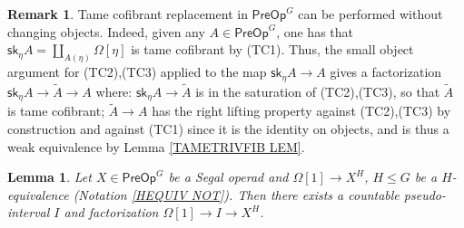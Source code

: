 \documentclass[a4paper,10pt
,draft
]{article}%
\numberwithin{equation}{section}
\numberwithin{figure}{section}
\newtheorem{lemma}[equation]{Lemma}%
\theoremstyle{definition} %
\newtheorem{remark}[equation]{Remark}%
\newcommand{\1}{\ensuremath{\mathbbm 1}}%
\begin{document}
\begin{remark}\label{TC2TC3REP REM}
	Tame cofibrant replacement in $\mathsf{PreOp}^G$
	can be performed without changing objects.
	Indeed, given any 
	$A \in \mathsf{PreOp}^G$,
	one has that
	$\mathsf{sk}_{\eta} A = 
	\coprod_{A(\eta)} \Omega[\eta]$
	is tame cofibrant by (TC1).
	Thus, the small object argument for (TC2),(TC3) 
	applied to the map 
	$\mathsf{sk}_{\eta} A \to A$
	gives a factorization
	$\mathsf{sk}_{\eta} A \to \widetilde{A} \to A$
	where:
	$\mathsf{sk}_{\eta} A \to \widetilde{A}$
	is in the saturation of (TC2),(TC3), so that
	$\widetilde{A}$ is tame cofibrant;
	$\widetilde{A} \to A$
	has the right lifting property against 
	(TC2),(TC3) by construction and against (TC1)
	since it is the identity on objects, 
	and is thus a weak equivalence by 
	Lemma \ref{TAMETRIVFIB LEM}.
\end{remark}



\begin{lemma}\label{SLIMOD LEM}
	Let $X \in \mathsf{PreOp}^G$
	be a Segal operad
	and $\Omega[1] \to X^H$, $H\leq G$
	be a $H$-equivalence
	(Notation \ref{HEQUIV NOT}).
	Then there exists a countable
	pseudo-interval $I$
	and factorization
	$\Omega[1] \to I \to X^H$.
\end{lemma}
\end{document}
